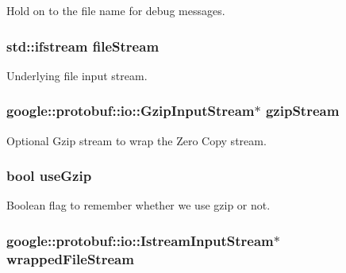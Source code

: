 Hold on to the file name for debug messages. \hypertarget{classProtoInputStream_a23e831057f578570b5bc50b8249d7868}{
\subsubsection[{fileStream}]{\setlength{\rightskip}{0pt plus 5cm}std::ifstream {\bf fileStream}}}
\label{classProtoInputStream_a23e831057f578570b5bc50b8249d7868}


Underlying file input stream. \hypertarget{classProtoInputStream_a9c61d33e805fe8fffb88db16ca97e44c}{
\subsubsection[{gzipStream}]{\setlength{\rightskip}{0pt plus 5cm}google::protobuf::io::GzipInputStream$\ast$ {\bf gzipStream}}}
\label{classProtoInputStream_a9c61d33e805fe8fffb88db16ca97e44c}


Optional Gzip stream to wrap the Zero Copy stream. \hypertarget{classProtoInputStream_a63bd265ebd8a0e6a43a46091b150f09f}{
\subsubsection[{useGzip}]{\setlength{\rightskip}{0pt plus 5cm}bool {\bf useGzip}}}
\label{classProtoInputStream_a63bd265ebd8a0e6a43a46091b150f09f}


Boolean flag to remember whether we use gzip or not. \hypertarget{classProtoInputStream_a14b2c5b4efb9f0bc3b6aec7b2f4748e2}{
\subsubsection[{wrappedFileStream}]{\setlength{\rightskip}{0pt plus 5cm}google::protobuf::io::IstreamInputStream$\ast$ {\bf wrappedFileStream}}}
\label{classProtoInputStream_a14b2c5b4efb9f0bc3b6aec7b2f4748e2}


